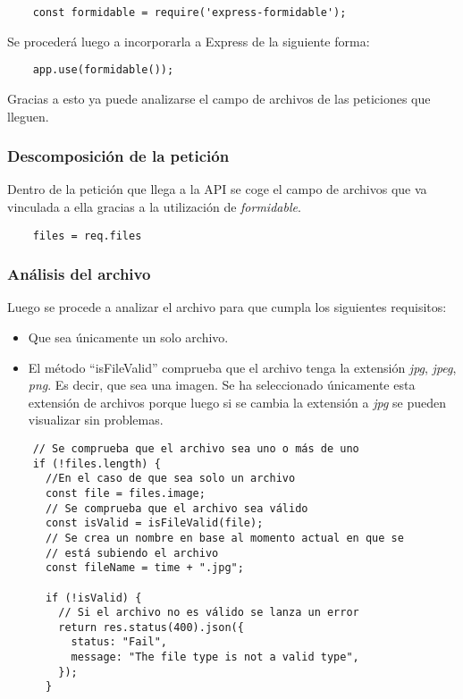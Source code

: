 \begin{verbatim}
    const formidable = require('express-formidable');
\end{verbatim}

Se procederá luego a incorporarla a Express de la siguiente forma:

\begin{verbatim}
    app.use(formidable());
\end{verbatim}

Gracias a esto ya puede analizarse el campo de archivos de las peticiones que lleguen.

\subsubsection{Descomposición de la petición}
Dentro de la petición que llega a la API se coge el campo de archivos que va vinculada a ella gracias a la utilización de \textit{formidable}.
\begin{verbatim}
    files = req.files
\end{verbatim}

\subsubsection{Análisis del archivo}
Luego se procede a analizar el archivo para que cumpla los siguientes requisitos:
\begin{itemize}
    \item Que sea únicamente un solo archivo.
    \item El método ``isFileValid'' comprueba que el archivo tenga la extensión \textit{jpg}, \textit{jpeg}, \textit{png}. Es decir, que sea una imagen. Se ha seleccionado únicamente esta extensión de archivos porque luego si se cambia la extensión a \textit{jpg} se pueden visualizar sin problemas.
\end{itemize}

\begin{verbatim}
    // Se comprueba que el archivo sea uno o más de uno
    if (!files.length) {
      //En el caso de que sea solo un archivo
      const file = files.image;
      // Se comprueba que el archivo sea válido
      const isValid = isFileValid(file);
      // Se crea un nombre en base al momento actual en que se
      // está subiendo el archivo
      const fileName = time + ".jpg";

      if (!isValid) {
        // Si el archivo no es válido se lanza un error
        return res.status(400).json({
          status: "Fail",
          message: "The file type is not a valid type",
        });
      }
\end{verbatim}

